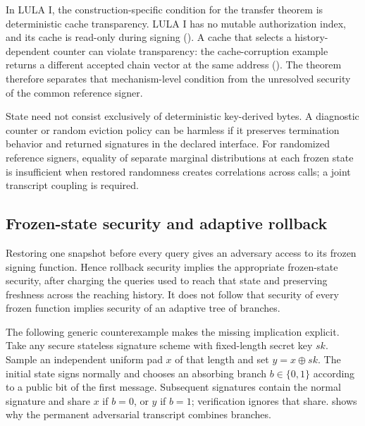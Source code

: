 \documentclass[a4paper,envcountsame,runningheads]{llncs}
\begin{document}
In LULA I, the construction-specific condition for the transfer theorem is deterministic cache transparency. LULA I has no mutable authorization index, and its cache is read-only during signing (). A cache that selects a history-dependent counter can violate transparency: the cache-corruption example returns a different accepted chain vector at the same address (). The theorem therefore separates that mechanism-level condition from the unresolved security of the common reference signer.

State need not consist exclusively of deterministic key-derived bytes. A diagnostic counter or random eviction policy can be harmless if it preserves termination behavior and returned signatures in the declared interface. For randomized reference signers, equality of separate marginal distributions at each frozen state is insufficient when restored randomness creates correlations across calls; a joint transcript coupling is required.

\subsection{Frozen-state security and adaptive rollback}\label{sec:frozen}
Restoring one snapshot before every query gives an adversary access to its frozen signing function. Hence rollback security implies the appropriate frozen-state security, after charging the queries used to reach that state and preserving freshness across the reaching history. It does not follow that security of every frozen function implies security of an adaptive tree of branches.

The following generic counterexample makes the missing implication explicit. Take any secure stateless signature scheme with fixed-length secret key $sk$. Sample an independent uniform pad $x$ of that length and set $y=x\oplus sk$. The initial state signs normally and chooses an absorbing branch $b\in\{0,1\}$ according to a public bit of the first message. Subsequent signatures contain the normal signature and share $x$ if $b=0$, or $y$ if $b=1$; verification ignores that share.  shows why the permanent adversarial transcript combines branches.
\end{document}
